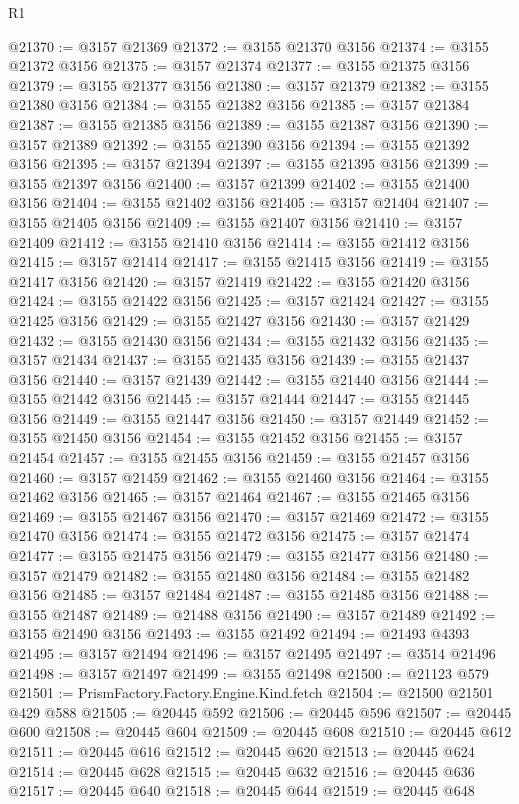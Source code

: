 \begin{lexlean}{R1}
\begin{coremodule}
@21370 := @3157 @21369
@21372 := @3155 @21370 @3156
@21374 := @3155 @21372 @3156
@21375 := @3157 @21374
@21377 := @3155 @21375 @3156
@21379 := @3155 @21377 @3156
@21380 := @3157 @21379
@21382 := @3155 @21380 @3156
@21384 := @3155 @21382 @3156
@21385 := @3157 @21384
@21387 := @3155 @21385 @3156
@21389 := @3155 @21387 @3156
@21390 := @3157 @21389
@21392 := @3155 @21390 @3156
@21394 := @3155 @21392 @3156
@21395 := @3157 @21394
@21397 := @3155 @21395 @3156
@21399 := @3155 @21397 @3156
@21400 := @3157 @21399
@21402 := @3155 @21400 @3156
@21404 := @3155 @21402 @3156
@21405 := @3157 @21404
@21407 := @3155 @21405 @3156
@21409 := @3155 @21407 @3156
@21410 := @3157 @21409
@21412 := @3155 @21410 @3156
@21414 := @3155 @21412 @3156
@21415 := @3157 @21414
@21417 := @3155 @21415 @3156
@21419 := @3155 @21417 @3156
@21420 := @3157 @21419
@21422 := @3155 @21420 @3156
@21424 := @3155 @21422 @3156
@21425 := @3157 @21424
@21427 := @3155 @21425 @3156
@21429 := @3155 @21427 @3156
@21430 := @3157 @21429
@21432 := @3155 @21430 @3156
@21434 := @3155 @21432 @3156
@21435 := @3157 @21434
@21437 := @3155 @21435 @3156
@21439 := @3155 @21437 @3156
@21440 := @3157 @21439
@21442 := @3155 @21440 @3156
@21444 := @3155 @21442 @3156
@21445 := @3157 @21444
@21447 := @3155 @21445 @3156
@21449 := @3155 @21447 @3156
@21450 := @3157 @21449
@21452 := @3155 @21450 @3156
@21454 := @3155 @21452 @3156
@21455 := @3157 @21454
@21457 := @3155 @21455 @3156
@21459 := @3155 @21457 @3156
@21460 := @3157 @21459
@21462 := @3155 @21460 @3156
@21464 := @3155 @21462 @3156
@21465 := @3157 @21464
@21467 := @3155 @21465 @3156
@21469 := @3155 @21467 @3156
@21470 := @3157 @21469
@21472 := @3155 @21470 @3156
@21474 := @3155 @21472 @3156
@21475 := @3157 @21474
@21477 := @3155 @21475 @3156
@21479 := @3155 @21477 @3156
@21480 := @3157 @21479
@21482 := @3155 @21480 @3156
@21484 := @3155 @21482 @3156
@21485 := @3157 @21484
@21487 := @3155 @21485 @3156
@21488 := @3155 @21487
@21489 := @21488 @3156
@21490 := @3157 @21489
@21492 := @3155 @21490 @3156
@21493 := @3155 @21492
@21494 := @21493 @4393
@21495 := @3157 @21494
@21496 := @3157 @21495
@21497 := @3514 @21496
@21498 := @3157 @21497
@21499 := @3155 @21498
@21500 := @21123 @579
@21501 := PrismFactory.Factory.Engine.Kind.fetch
@21504 := @21500 @21501 @429 @588
@21505 := @20445 @592
@21506 := @20445 @596
@21507 := @20445 @600
@21508 := @20445 @604
@21509 := @20445 @608
@21510 := @20445 @612
@21511 := @20445 @616
@21512 := @20445 @620
@21513 := @20445 @624
@21514 := @20445 @628
@21515 := @20445 @632
@21516 := @20445 @636
@21517 := @20445 @640
@21518 := @20445 @644
@21519 := @20445 @648

\end{coremodule}
\end{lexlean}

